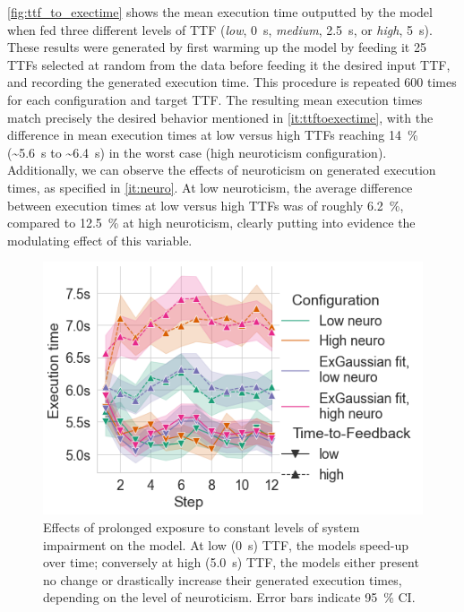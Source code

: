 \cref{fig:ttf_to_exectime} shows the mean execution time outputted by the model when fed three different levels of \ac{TTF} (\emph{low}, \SI{0}{\second}, \emph{medium}, \SI{2.5}{\second}, or \emph{high}, \SI{5}{\second}).
These results were generated by first warming up the model by feeding it \num{25} \acp{TTF} selected at random from the data before feeding it the desired input \ac{TTF}, and recording the generated execution time.
This procedure is repeated \num{600} times for each configuration and target \ac{TTF}.
The resulting mean execution times match precisely the desired behavior mentioned in \cref{it:ttftoexectime}, with the difference in mean execution times at low versus high \acp{TTF} reaching \SI{14}{\percent} (\textasciitilde\SI{5.6}{\second} to \textasciitilde\SI{6.4}{\second}) in the worst case (high neuroticism configuration).
Additionally, we can observe the effects of neuroticism on generated execution times, as specified in \cref{it:neuro}.
At low neuroticism, the average difference between execution times at low versus high \acp{TTF} was of roughly \SI{6.2}{\percent}, compared to \SI{12.5}{\percent} at high neuroticism, clearly putting into evidence the modulating effect of this variable.

\begin{figure}
    \centering
    \includegraphics[width=\columnwidth]{figs/new_model/exectime_over_steps.png}
    \caption{%
    Effects of prolonged exposure to constant levels of system impairment on the model.
    At low (\SI{0}{\second}) \ac{TTF}, the models speed-up over time; conversely at high (\SI{5.0}{\second}) \ac{TTF}, the models either present no change or drastically increase their generated execution times, depending on the level of neuroticism.
    Error bars indicate \SI{95}{\percent} \ac{CI}.
    }\label{fig:exectimeduration}
\end{figure}

